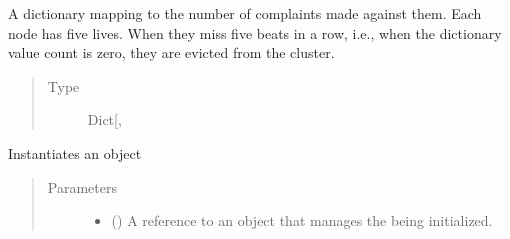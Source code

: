 \documentclass[letterpaper,10pt,english]{sphinxmanual}
\begin{document}
\begin{fulllineitems}

\begin{fulllineitems}
\label{\detokenize{app.domain:app.domain.cluster_groups.HDFSCluster.data_node_heartbeats}}
A dictionary mapping {\hyperref[\detokenize{app.domain:app.domain.network_nodes.Node.id}]{}} to the number of
complaints made against them. Each node has five lives. When they
miss five beats in a row, i.e., when the dictionary value count
is zero, they are evicted from the cluster.
\begin{quote}\begin{description}
\item[{Type}] \leavevmode
Dict{[}, \sphinxhref{https://docs.python.org/3.7/library/functions.html\#int}{int}{]}

\end{description}\end{quote}

\end{fulllineitems}


\begin{fulllineitems}
\label{\detokenize{app.domain:app.domain.cluster_groups.HDFSCluster.__init__}}
Instantiates an  object
\begin{quote}\begin{description}
\item[{Parameters}] \leavevmode\begin{itemize}
\item {} 
 ({\hyperref[\detokenize{app:app.type_hints.MasterType}]{}}) \textendash{} A reference to an {\hyperref[\detokenize{app.domain:app.domain.master_servers.Master}]{}}
object that manages the  being initialized.


\end{itemize}
\end{description}
\end{quote}
\end{fulllineitems}
\end{fulllineitems}
\end{document}
